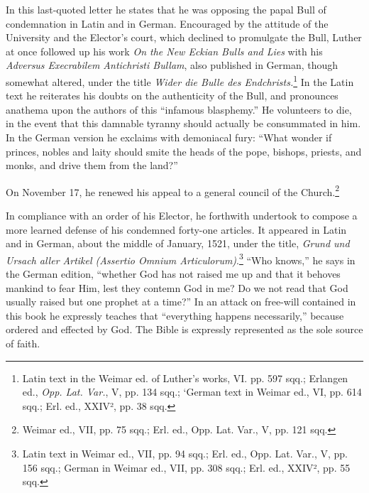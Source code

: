 In this last-quoted letter he states that he was opposing the papal
Bull of condemnation in Latin and in German. Encouraged by the
attitude of the University and the Elector’s court, which declined to
promulgate the Bull, Luther at once followed up his work \textit{On the
New Eckian Bulls and Lies} with his \textit{Adversus Execrabilem Antichristi
Bullam}, also published in German, though somewhat altered,
under the title \textit{Wider die Bulle des Endchrists.}\footnote
{Latin text in the Weimar ed. of Luther’s works, VI. pp. 597 sqq.; Erlangen ed., \textit{Opp.
Lat. Var.}, V, pp. 134 sqq.; ‘German text in Weimar ed., VI, pp. 614 sqq.; Erl. ed., XXIV²,
pp. 38 sqq.}
In the Latin text he
reiterates his doubts on the authenticity of the Bull, and pronounces
anathema upon the authors of this “infamous blasphemy.” He volunteers
to die, in the event that this damnable tyranny should actually
be consummated in him. In the German version he exclaims with
demoniacal fury: “What wonder if princes, nobles and laity should
smite the heads of the pope, bishops, priests, and monks, and drive
them from the land?”

On November 17, he renewed his appeal to a general council of
the Church.\footnote{Weimar ed., VII, pp. 75 sqq.; Erl. ed., Opp. Lat. Var., V, pp. 121 sqq.}

In compliance with an order of his Elector, he forthwith undertook to compose
a more learned defense of his condemned forty-one
articles. It appeared in Latin and in German, about the middle of
January, 1521, under the title, \textit{Grund und Ursach aller Artikel (Assertio
Omnium Articulorum)}.\footnote
{Latin text in Weimar ed., VII, pp. 94 sqq.; Erl. ed., Opp. Lat. Var., V, pp. 156 sqq.;
German in Weimar ed., VII, pp. 308 sqq.; Erl. ed., XXIV², pp. 55 sqq.}
“Who knows,” he says in the German
edition, “whether God has not raised me up and that it behoves
mankind to fear Him, lest they contemn God in me? Do we not read
that God usually raised but one prophet at a time?” In an attack on
free-will contained in this book he expressly teaches that “everything
happens necessarily,” because ordered and effected by God. The
Bible is expressly represented as the sole source of faith.
